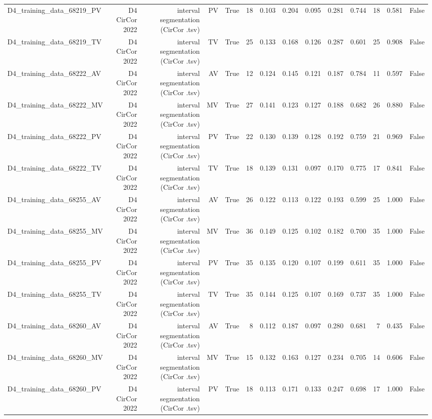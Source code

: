 \begin{table}[htbp]
\begin{tabular}{lrrrrrrrrrrrrr}
    D4\_training\_data\_68219\_PV & D4 CirCor 2022 & interval segmentation (CirCor .tsv) & PV & True & 18 & 0.103 & 0.204 & 0.095 & 0.281 & 0.744 & 18 & 0.581 & False \\
    D4\_training\_data\_68219\_TV & D4 CirCor 2022 & interval segmentation (CirCor .tsv) & TV & True & 25 & 0.133 & 0.168 & 0.126 & 0.287 & 0.601 & 25 & 0.908 & False \\
    D4\_training\_data\_68222\_AV & D4 CirCor 2022 & interval segmentation (CirCor .tsv) & AV & True & 12 & 0.124 & 0.145 & 0.121 & 0.187 & 0.784 & 11 & 0.597 & False \\
    D4\_training\_data\_68222\_MV & D4 CirCor 2022 & interval segmentation (CirCor .tsv) & MV & True & 27 & 0.141 & 0.123 & 0.127 & 0.188 & 0.682 & 26 & 0.880 & False \\
    D4\_training\_data\_68222\_PV & D4 CirCor 2022 & interval segmentation (CirCor .tsv) & PV & True & 22 & 0.130 & 0.139 & 0.128 & 0.192 & 0.759 & 21 & 0.969 & False \\
    D4\_training\_data\_68222\_TV & D4 CirCor 2022 & interval segmentation (CirCor .tsv) & TV & True & 18 & 0.139 & 0.131 & 0.097 & 0.170 & 0.775 & 17 & 0.841 & False \\
    D4\_training\_data\_68255\_AV & D4 CirCor 2022 & interval segmentation (CirCor .tsv) & AV & True & 26 & 0.122 & 0.113 & 0.122 & 0.193 & 0.599 & 25 & 1.000 & False \\
    D4\_training\_data\_68255\_MV & D4 CirCor 2022 & interval segmentation (CirCor .tsv) & MV & True & 36 & 0.149 & 0.125 & 0.102 & 0.182 & 0.700 & 35 & 1.000 & False \\
    D4\_training\_data\_68255\_PV & D4 CirCor 2022 & interval segmentation (CirCor .tsv) & PV & True & 35 & 0.135 & 0.120 & 0.107 & 0.199 & 0.611 & 35 & 1.000 & False \\
    D4\_training\_data\_68255\_TV & D4 CirCor 2022 & interval segmentation (CirCor .tsv) & TV & True & 35 & 0.144 & 0.125 & 0.107 & 0.169 & 0.737 & 35 & 1.000 & False \\
    D4\_training\_data\_68260\_AV & D4 CirCor 2022 & interval segmentation (CirCor .tsv) & AV & True & 8 & 0.112 & 0.187 & 0.097 & 0.280 & 0.681 & 7 & 0.435 & False \\
    D4\_training\_data\_68260\_MV & D4 CirCor 2022 & interval segmentation (CirCor .tsv) & MV & True & 15 & 0.132 & 0.163 & 0.127 & 0.234 & 0.705 & 14 & 0.606 & False \\
    D4\_training\_data\_68260\_PV & D4 CirCor 2022 & interval segmentation (CirCor .tsv) & PV & True & 18 & 0.113 & 0.171 & 0.133 & 0.247 & 0.698 & 17 & 1.000 & False \\

\end{tabular}
\end{table}
